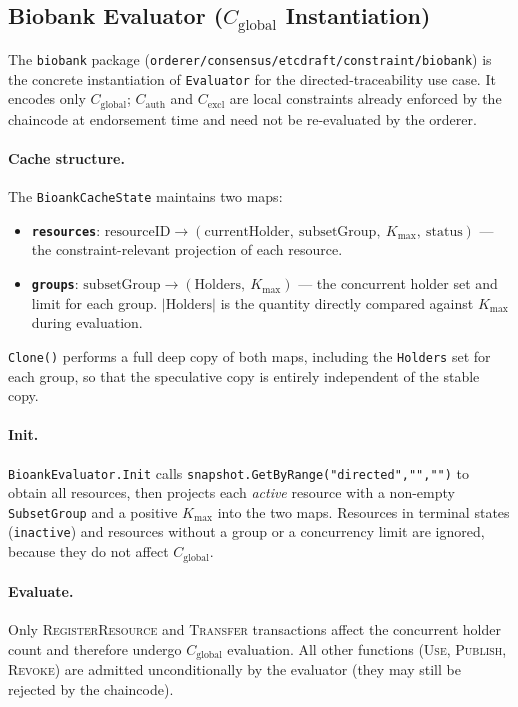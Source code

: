 \subsection{Biobank Evaluator (\(C_\text{global}\) Instantiation)}
\label{subsec:impl-evaluator}

The \texttt{biobank} package
(\texttt{orderer/consensus/etcdraft/constraint/biobank}) is the concrete
instantiation of \texttt{Evaluator} for the directed-traceability use case.
It encodes only $C_\text{global}$; $C_\text{auth}$ and $C_\text{excl}$ are
local constraints already enforced by the chaincode at endorsement time and
need not be re-evaluated by the orderer.

\paragraph{Cache structure.}
The \texttt{BioankCacheState} maintains two maps:
\begin{itemize}
  \item \textbf{\texttt{resources}}: $\text{resourceID} \to (
    \text{currentHolder},\ \text{subsetGroup},\ K_\text{max},\ \text{status})$
    — the constraint-relevant projection of each resource.
  \item \textbf{\texttt{groups}}: $\text{subsetGroup} \to (\text{Holders},\
    K_\text{max})$ — the concurrent holder set and limit for each group.
    $|\text{Holders}|$ is the quantity directly compared against $K_\text{max}$
    during evaluation.
\end{itemize}
\texttt{Clone()} performs a full deep copy of both maps, including the
\texttt{Holders} set for each group, so that the speculative copy is
entirely independent of the stable copy.

\paragraph{Init.}
\texttt{BioankEvaluator.Init} calls \texttt{snapshot.GetByRange("directed","","")}
to obtain all resources, then projects each \emph{active} resource with a
non-empty \texttt{SubsetGroup} and a positive $K_\text{max}$ into the two maps.
Resources in terminal states (\texttt{inactive}) and resources without a group
or a concurrency limit are ignored, because they do not affect $C_\text{global}$.

\paragraph{Evaluate.}
Only \textsc{RegisterResource} and \textsc{Transfer} transactions affect the
concurrent holder count and therefore undergo $C_\text{global}$ evaluation.
All other functions (\textsc{Use}, \textsc{Publish}, \textsc{Revoke}) are
admitted unconditionally by the evaluator (they may still be rejected by the
chaincode).

